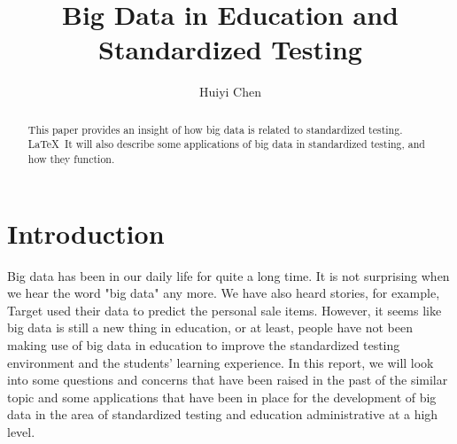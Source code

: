 \documentclass[sigconf]{acmart}
\begin{document}
\title{Big Data in Education and Standardized Testing}


\author{Huiyi Chen}



\renewcommand{\shortauthors}{H. CHEN}


\begin{abstract}
This paper provides an insight of how big data is related to standardized testing. \LaTeX\ It will also describe some applications of big data in standardized testing, and how they function.
\end{abstract}



\maketitle

\section{Introduction}

Big data has been in our daily life for quite a long time. It is not surprising when we hear the word "big data" any more. We have also heard stories, for example, Target used their data to predict the personal sale items. However, it seems like big data is still a new thing in education, or at least, people have not been making use of big data in education to improve the standardized testing environment and the students' learning experience. In this report, we will look into some questions and concerns that have been raised in the past of the similar topic and some applications that have been in place for the development of big data in the area of standardized testing and education administrative at a high level.
\end{document}

